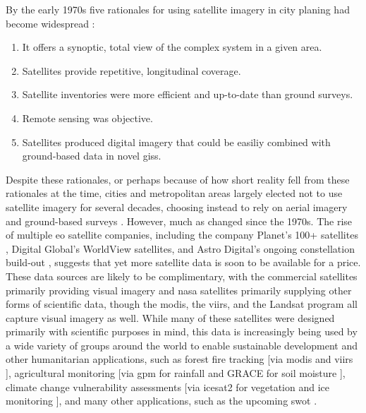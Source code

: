 \documentclass[notitlepage]{article}
\begin{document}
By the early 1970s five rationales for using satellite imagery in city planing had become widespread \cite{lightWarfareWelfareDefense2005}:

\begin{enumerate}[itemsep=0pt,parsep=0pt]
	\item{It offers a synoptic, total view of the complex system in a given area.}
	\item{Satellites provide repetitive, longitudinal coverage.}
	\item{Satellite inventories were more efficient and up-to-date than ground surveys.}
	\item{Remote sensing was objective.}
	\item{Satellites produced digital imagery that could be easiliy combined with ground-based data in novel \acp{gis}.}
\end{enumerate}

Despite these rationales, or perhaps because of how short reality fell from these rationales at the time, cities and metropolitan areas largely elected not to use satellite imagery for several decades, choosing instead to rely on aerial imagery and ground-based surveys \cite{lightWarfareWelfareDefense2005}. However, much as changed since the 1970s. The rise of multiple \ac{eo} satellite companies, including the company Planet's 100+ satellites \cite{tepperSatelliteMakerPlanet2015}, Digital Global's WorldView satellites, and Astro Digital’s ongoing constellation build-out \cite{shieberAstroDigitalLaunched2017}, suggests that yet more satellite data is soon to be available for a price. These data sources are likely to be complimentary, with the commercial satellites primarily providing visual imagery and \ac{nasa} satellites primarily supplying other forms of scientific data, though the \ac{modis}, the \ac{viirs}, and the Landsat program all capture visual imagery as well. While many of these satellites were designed primarily with scientific purposes in mind, this data is increasingly being used by a wide variety of groups around the world to enable sustainable development and other humanitarian applications, such as  forest fire tracking [via \ac{modis} and \ac{viirs} \cite{schroederNewVIIRS375m2014}], agricultural monitoring [via \ac{gpm} for rainfall \cite{houGlobalPrecipitationMeasurement2014} and GRACE for soil moisture \cite{wahrTimevariableGravityGRACE2004}], climate change vulnerability assessments [via \ac{icesat2} for vegetation and ice monitoring \cite{mcgillMultipleAltimeterBeam2013}], and many other applications, such as the upcoming \ac{swot} \cite{biancamariaSWOTMissionIts2016}.
\end{document}
